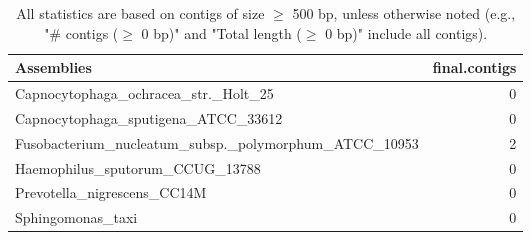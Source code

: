 \documentclass[12pt,a4paper]{article}
\begin{document}
\begin{table}[ht]
\begin{center}
\caption{All statistics are based on contigs of size $\geq$ 500 bp, unless otherwise noted (e.g., "\# contigs ($\geq$ 0 bp)" and "Total length ($\geq$ 0 bp)" include all contigs).}
\begin{tabular}{|l*{1}{|r}|}
\hline
Assemblies & final.contigs \\ \hline
Capnocytophaga\_ochracea\_str.\_Holt\_25 & 0 \\ \hline
Capnocytophaga\_sputigena\_ATCC\_33612 & 0 \\ \hline
Fusobacterium\_nucleatum\_subsp.\_polymorphum\_ATCC\_10953 & 2 \\ \hline
Haemophilus\_sputorum\_CCUG\_13788 & 0 \\ \hline
Prevotella\_nigrescens\_CC14M & 0 \\ \hline
Sphingomonas\_taxi & 0 \\ \hline
\end{tabular}
\end{center}
\end{table}
\end{document}
